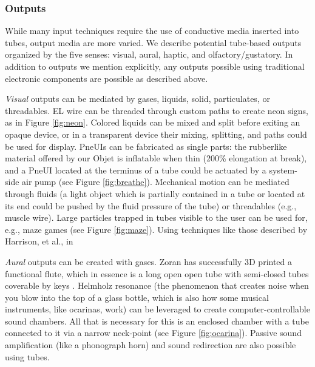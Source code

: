 \subsubsection{Outputs}

While many input techniques require the use of conductive media inserted into tubes, output media are more varied.  We describe potential tube-based outputs organized by the five senses: visual, aural, haptic, and olfactory/gustatory.  In addition to outputs we mention explicitly, any outputs possible using traditional electronic components are possible as described above.

\emph{Visual} outputs can be mediated by gases, liquids, solid, particulates, or threadables.  EL wire can be threaded through custom paths to create neon signs, as in Figure \ref{fig:neon}.  Colored liquids can be mixed and split before exiting an opaque device, or in a transparent device their mixing, splitting, and paths could be used for display.  PneUIs \cite{Yao-pneui} can be fabricated as single parts: the rubberlike material offered by our Objet is inflatable when thin (200\% elongation at break), and a PneUI located at the terminus of a tube could be actuated by a system-side air pump (see Figure \ref{fig:breathe}).  Mechanical motion can be mediated through fluids (a light object which is partially contained in a tube or located at its end could be pushed by the fluid pressure of the tube) or threadables (e.g., muscle wire).  Large particles trapped in tubes visible to the user can be used for, e.g., maze games (see Figure \ref{fig:maze}).  Using techniques like those described by Harrison, et al., in \cite{Harrison-buttons}  

\emph{Aural} outputs can be created with gases.  Zoran has successfully 3D printed a functional flute, which in essence is a long open open tube with semi-closed tubes coverable by keys \cite{Zoran-flute}.  Helmholz resonance (the phenomenon that creates noise when you blow into the top of a glass bottle, which is also how some musical instruments, like ocarinas, work) can be leveraged to create computer-controllable sound chambers.  All that is necessary for this is an enclosed chamber with a tube connected to it via a narrow neck-point (see Figure \ref{fig:ocarina}).  Passive sound amplification (like a phonograph horn) and sound redirection are also possible using tubes.

